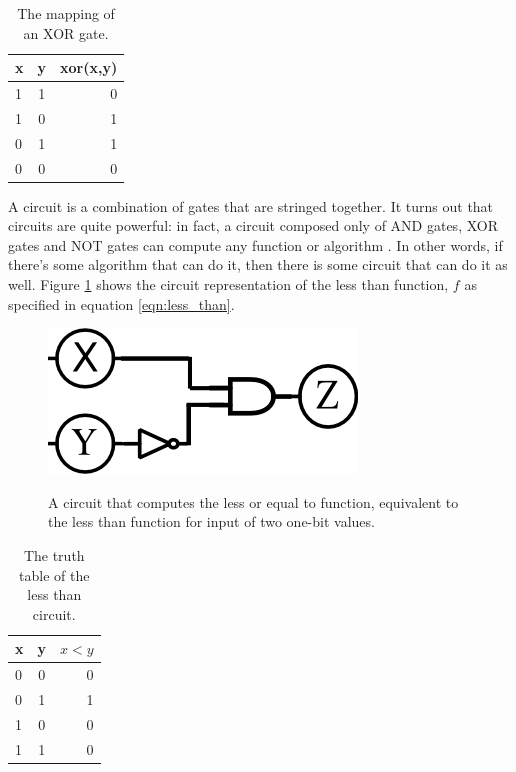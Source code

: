 \begin{table}[h]
\label{tab:xor}
\centering
\begin{tabular}{ | l | c || r |}
\hline
x & y & xor(x,y) \\ \hline
1 & 1 & 0 \\ \hline
1 & 0 & 1 \\ \hline
0 & 1 & 1 \\ \hline
0 & 0 & 0 \\ \hline
\end{tabular}
\caption{The mapping of an XOR gate.}
\end{table}

A circuit is a combination of gates that are stringed together.
It turns out that circuits are quite powerful: in fact, a circuit composed only of AND gates, XOR gates and NOT gates can compute any function or algorithm \cite{Goldreich}.
In other words, if there's some algorithm that can do it, then there is some circuit that can do it as well.
Figure \ref{fig:less_than_circuit} shows the circuit representation of the less than function, $f$ as specified in equation \ref{eqn:less_than}.

\begin{figure}[h]
    \centering
    \includegraphics[scale=0.75]{images/drawing.png}
    \label{fig:less_than_circuit}
    \caption{A circuit that computes the less or equal to function, equivalent to the less than function for input of two one-bit values.}
\end{figure}

\begin{table}[h]
\label{tab:less_than}
\centering
\begin{tabular}{ | l | c || r |}
\hline
x & y & $x < y$ \\ \hline
0 & 0 & 0 \\ \hline
0 & 1 & 1 \\ \hline
1 & 0 & 0 \\ \hline
1 & 1 & 0 \\ \hline
\end{tabular}
\caption{The truth table of the less than circuit.}
\end{table}

